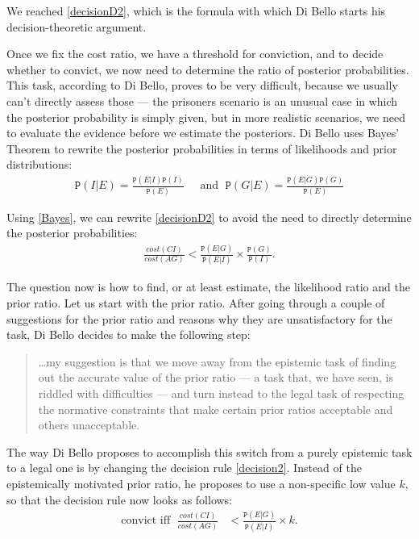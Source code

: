 \documentclass{article}
\newcommand{\pr}[1]{\mbox{$\mathtt{P}(#1)$}}
\begin{document}
\noindent We reached \eqref{decisionD2}, which is the formula with which  Di Bello starts his decision-theoretic argument.

Once we fix the cost ratio, we have a threshold for conviction, and  to decide whether to convict, we now need to determine  the ratio of posterior probabilities. This task, according to Di Bello, proves to be very difficult, because we usually can't directly assess those --- the prisoners scenario is an unusual case in which the posterior probability is simply given, but in more realistic scenarios, we need to evaluate the evidence before we estimate the posteriors. Di Bello uses Bayes' Theorem to rewrite the posterior probabilities in terms of  likelihoods  and prior distributions: 
\begin{align}\label{Bayes}
\pr{I\vert E}=\frac{\pr{E\vert I} \pr{I}}{\pr{E}}\;\,\, &\text{and}\;\,\,  \pr{G\vert E}=\frac{\pr{E\vert G} \pr{G}}{\pr{E}}
\end{align}

\noindent Using  \eqref{Bayes}, we can rewrite \eqref{decisionD2} to avoid the need to directly determine the posterior probabilities: 
	\begin{align}\label{decision2}
	\frac{cost(CI)}{cost(AG)}<\frac{\pr{E\vert G}}{\pr{E\vert I}}\times\frac{\pr{G}}{\pr{I}}.
	\end{align}    

	The question now is how to find, or at least estimate, the likelihood ratio and the prior ratio. Let us start with the prior ratio. After going through a couple of suggestions for the prior ratio and reasons why they are unsatisfactory for the task, Di Bello decides to make the following step:
	
	\begin{quotation}
		\dots my suggestion is that we move away from the epistemic task of finding out the accurate value of the prior ratio --- a task that, we have seen, is riddled with difficulties --- and turn instead to the legal task of respecting the normative constraints that make certain prior ratios acceptable and others unacceptable.

		\noindent  \citep[14]{dibello2019TrialStatisticsHigh}
	\end{quotation}
	
	The way Di Bello proposes to accomplish this switch from a purely epistemic task to a legal one is by  changing  the decision rule \eqref{decision2}. Instead of the epistemically motivated prior ratio, he proposes to use  a non-specific   low value $k$, so that the decision rule now looks as follows:
	\begin{align}\label{decision3}
	\text{convict iff}\,\,\;\frac{cost(CI)}{cost(AG)}& <\frac{\pr{E\vert G}}{\pr{E\vert I}}\times k.
	\end{align} 
	
\end{document}
